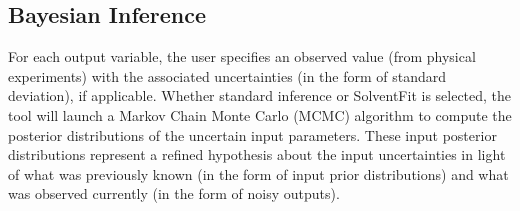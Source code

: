 \subsection{Bayesian Inference}

For each output variable, the user specifies an observed value (from
physical experiments) with the associated uncertainties (in the form of
standard deviation), if applicable. Whether standard inference or
SolventFit is selected, the tool will launch a Markov Chain Monte Carlo (MCMC)
algorithm to compute the posterior distributions of the uncertain input
parameters. These input posterior distributions represent a refined
hypothesis about the input uncertainties in light of what was previously
known (in the form of input prior distributions) and what was observed
currently (in the form of noisy outputs).

